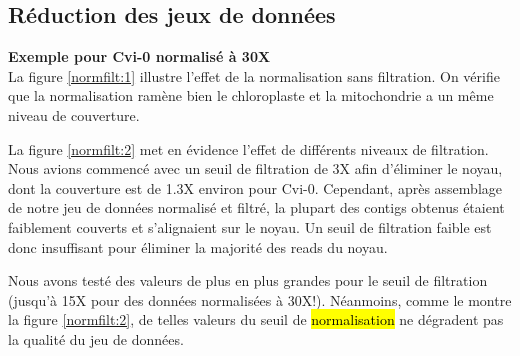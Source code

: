 \documentclass[a4paper]{article}
\newcommand{\rewrite}[1]{\todo[color=green!40]{#1}}
\newcommand{\hlrewrite}[2]{\sethlcolor{green} \hl{#1} \rewrite{#2}}
\begin{document}
\subsection{Réduction des jeux de données}
\hspace{1cm}\textbf{Exemple pour Cvi-0 normalisé à 30X}\\

La figure \ref{normfilt:1} illustre l'effet de la normalisation sans filtration. On vérifie que la normalisation ramène bien le chloroplaste et la mitochondrie a un même niveau de couverture. 

La figure \ref{normfilt:2} met en évidence l'effet de différents niveaux de filtration. Nous avions commencé avec un seuil de filtration de 3X afin d'éliminer le noyau, dont la couverture est de 1.3X environ pour Cvi-0. Cependant, après assemblage de notre jeu de données normalisé et filtré, la plupart des contigs obtenus étaient faiblement couverts et s'alignaient sur le noyau. Un seuil de filtration faible est donc insuffisant pour éliminer la majorité des reads du noyau. 

Nous avons testé des valeurs de plus en plus grandes pour le seuil de filtration (jusqu'à 15X pour des données normalisées à 30X!). Néanmoins, comme le montre la figure \ref{normfilt:2}, de telles valeurs du seuil de \hlrewrite{normalisation}{filtration} ne dégradent pas la qualité du jeu de données. 
\end{document}
